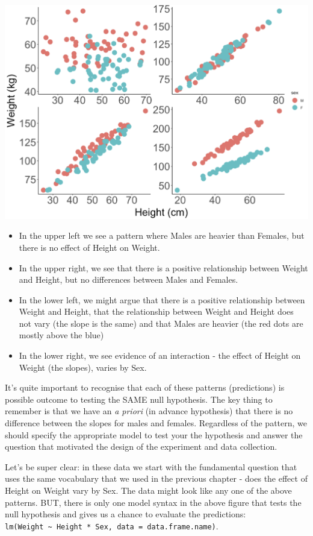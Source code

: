 \documentclass[
]{book}
\providecommand{\tightlist}{%
  \setlength{\itemsep}{0pt}\setlength{\parskip}{0pt}}
\begin{document}
\includegraphics[width=17.89in]{images/ANCOVA_1}

\begin{itemize}
\tightlist
\item
  In the upper left we see a pattern where Males are heavier than Females, but there is no effect of Height on Weight.
\item
  In the upper right, we see that there is a positive relationship between Weight and Height, but no differences between Males and Females.
\item
  In the lower left, we might argue that there is a positive relationship between Weight and Height, that the relationship between Weight and Height does not vary (the slope is the same) and that Males are heavier (the red dots are mostly above the blue)
\item
  In the lower right, we see evidence of an interaction - the effect of Height on Weight (the slopes), varies by Sex.
\end{itemize}

It's quite important to recognise that each of these patterns (predictions) is possible outcome to testing the SAME null hypothesis. The key thing to remember is that we have an \emph{a priori} (in advance hypothesis) that there is no difference between the slopes for males and females. Regardless of the pattern, we should specify the appropriate model to test your the hypothesis and answer the question that motivated the design of the experiment and data collection.

Let's be super clear: in these data we start with the fundamental question that uses the same vocabulary that we used in the previous chapter - does the effect of Height on Weight vary by Sex. The data might look like any one of the above patterns. BUT, there is only one model syntax in the above figure that tests the null hypothesis and gives us a chance to evaluate the predictions: \texttt{lm(Weight\ \textasciitilde{}\ Height\ *\ Sex,\ data\ =\ data.frame.name)}.
\end{document}
